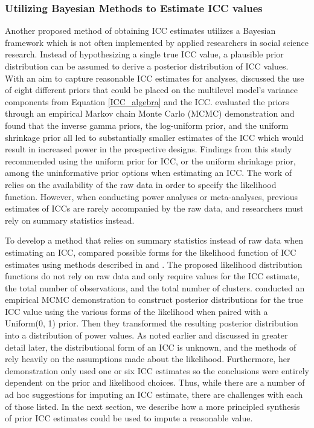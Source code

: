 \subsubsection{Utilizing Bayesian Methods to Estimate ICC values}
Another proposed method of obtaining ICC estimates utilizes a Bayesian framework which is not often implemented by applied researchers in social science research. Instead of hypothesizing a single true ICC value, a plausible prior distribution can be assumed to derive a posterior distribution of ICC values. With an aim to capture reasonable ICC estimates for analyses,  discussed the use of eight different priors that could be placed on the multilevel model’s variance components from Equation \ref{ICC_algebra} and the ICC.   evaluated the priors through an empirical Markov chain Monte Carlo (MCMC) demonstration and found that the inverse gamma priors, the log-uniform prior, and the uniform shrinkage prior all led to substantially smaller estimates of the ICC which would result in increased power in the prospective designs. Findings from this study recommended using the uniform prior for ICC, or the uniform shrinkage prior, among the uninformative prior options when estimating an ICC. The work of  relies on the availability of the raw data in order to specify the likelihood function. However, when conducting power analyses or meta-analyses, previous estimates of ICCs are rarely accompanied by the raw data, and researchers must rely on summary statistics instead. 

To develop a method that relies on summary statistics instead of raw data when estimating an ICC,  compared possible forms for the likelihood function of ICC estimates using methods described in  and . The proposed likelihood distribution functions do not rely on raw data and only require values for the ICC estimate, the total number of observations, and the total number of clusters.  conducted an empirical MCMC demonstration to construct posterior distributions for the true ICC value using the various forms of the likelihood when paired with a Uniform(0, 1) prior. Then they transformed the resulting posterior distribution into a distribution of power values. As noted earlier and discussed in greater detail later, the distributional form of an ICC is unknown, and the methods of  rely heavily on the assumptions made about the likelihood. Furthermore, her demonstration only used one or six ICC estimates so the conclusions were entirely dependent on the prior and likelihood choices. Thus, while there are a number of ad hoc suggestions for imputing an ICC estimate, there are challenges with each of those listed. In the next section, we describe how a more principled synthesis of prior ICC estimates could be used to impute a reasonable value.



